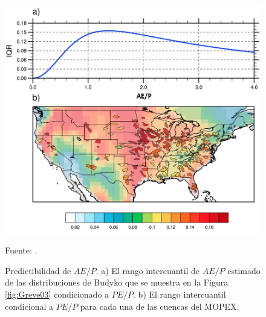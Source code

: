 \begin{figure}[ht]
\centering
	\includegraphics[scale=0.55]{Images/Greve04.png}
	\caption{Predictibilidad de $AE/P$. a) El rango intercuantil de $AE/P$ estimado de las distribuciones de Budyko que se muestra en la Figura \ref{fig:Greve03} condicionado a $PE/P$. b) El rango intercuantil condicional a $PE/P$ para cada una de las cuencas del MOPEX.}
	Fuente: \citet{Greve2015}.
	\label{fig:Greve04}
\end{figure}